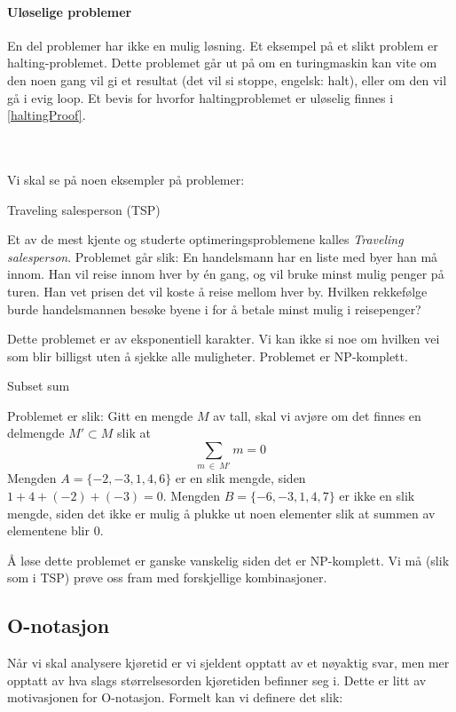 \paragraph{Uløselige problemer} 
En del problemer har ikke en mulig løsning. Et eksempel på et slikt problem er halting-problemet. Dette problemet går ut på om en turingmaskin kan vite om den noen gang vil gi et resultat (det vil si stoppe, engelsk: halt), eller om den vil gå i evig loop. Et bevis for hvorfor haltingproblemet er uløselig finnes i \ref{haltingProof}. 

~\\~\\
\noindent Vi skal se på noen eksempler på problemer:

\begin{eks}
Traveling salesperson (TSP)

Et av de mest kjente og studerte optimeringsproblemene kalles \emph{Traveling salesperson}. Problemet går slik: En handelsmann har en liste med byer han må innom. Han vil reise innom hver by én gang, og vil bruke minst mulig penger på turen. Han vet prisen det vil koste å reise mellom hver by. Hvilken rekkefølge burde handelsmannen besøke byene i for å betale minst mulig i reisepenger?

Dette problemet er av eksponentiell karakter. Vi kan ikke si noe om hvilken vei som blir billigst uten å sjekke alle muligheter. Problemet er NP-komplett.
\end{eks}


\begin{eks}
Subset sum

Problemet er slik: Gitt en mengde $ M $ av tall, skal vi avjøre om det finnes en delmengde $ M' \subset M $ slik at  \[ \sum_{m~\in~M'} m = 0  \] Mengden $ A =  \{-2, -3, 1, 4, 6\} $ er en slik mengde, siden $ 1 + 4 + (-2) + (-3) = 0 $. Mengden $ B = \{-6, -3, 1, 4, 7\} $ er ikke en slik mengde, siden det ikke er mulig å plukke ut noen elementer slik at summen av elementene blir 0.

Å løse dette problemet er ganske vanskelig siden det er NP-komplett. Vi må (slik som i TSP) prøve oss fram med forskjellige kombinasjoner. 
\end{eks}



\subsection{O-notasjon}
Når vi skal analysere kjøretid er vi sjeldent opptatt av et nøyaktig svar, men mer opptatt av hva slags størrelsesorden kjøretiden befinner seg i. Dette er litt av motivasjonen for O-notasjon. Formelt kan vi definere det slik:

